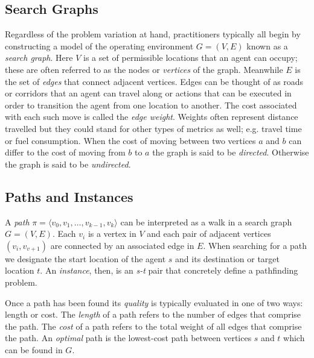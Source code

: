 \subsection{Search Graphs}
\label{cha::lit::problem::graphs}
Regardless of the problem variation at hand, practitioners typically all begin
by constructing a model of the operating environment $G = (V, E)$ known as a 
\emph{search graph}. Here $V$ is a set of permissible locations that an agent
can occupy; these are often referred to as the nodes or \emph{vertices} of the
graph. Meanwhile $E$ is the set of \emph{edges} that connect adjacent vertices.
Edges can be thought of as roads or corridors that an agent can travel along or
actions that can be executed in order to transition the agent from one location
to another.  The cost associated with each such move is called the \emph{edge
weight}.  Weights often represent distance travelled but they could stand for
other types of metrics as well; e.g.  travel time or fuel consumption.  When the
cost of moving between two vertices $a$ and $b$ can differ to the cost of moving
from $b$ to $a$ the graph is said to be \emph{directed}.  Otherwise 
the graph is said to be \emph{undirected}.


\subsection{Paths and Instances}
\label{cha::lit::problem::instance}
A \emph{path} $\pi = \langle v_0, v_1, \ldots, v_{k-1},  v_k \rangle$
can be interpreted as a walk in a search graph $G = (V, E)$.
Each $v_i$ is a vertex in $V$ and each pair of adjacent 
vertices $(v_i, v_{v+1})$ are connected by an associated edge in $E$.  
When searching for a path we designate the start location of the agent $s$ and 
its destination or target location $t$. An \emph{instance}, then, is an
\emph{s-t} pair that concretely define a pathfinding problem. 

Once a path has been found its \emph{quality} is typically evaluated in one of 
two ways: length or cost.
The \emph{length} of a path refers to the number of edges that comprise the path.
The \emph{cost} of a path refers to the total weight of all edges that comprise the path. 
An \emph{optimal} path is the lowest-cost path between vertices $s$ and $t$
which can be found in $G$.

